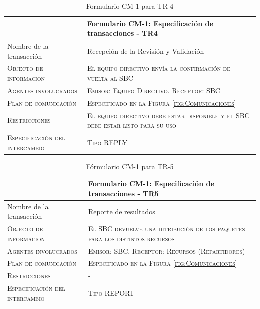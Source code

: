 \begin{table}[H]
  \scriptsize
  \begin{tabularx}{\textwidth}{|l|X|} \hline
    & \textbf{Formulario CM-1: Especificación de transacciones - TR4} \\
    \hline\hline
    {Nombre de la transacción} & Recepción de la Revisión y Validación\\
    \hline  
    \textsc{Objecto de informacion} & \textsc{El equipo directivo envía la confirmación de vuelta al SBC}\\ 
    \hline
    \textsc{Agentes involucrados} & \textsc{Emisor: Equipo Directivo. Receptor: SBC}\\ 
    \hline
    \textsc{Plan de comunicación} & \textsc{Especificado en la Figura \ref{fig:Comunicaciones}}\\ 
    \hline
    \textsc{Restricciones} & \textsc{El equipo directivo debe estar disponible y el SBC debe estar listo para su uso}\\ 
    \hline
    \textsc{Especificación del intercambio} & \textsc{Tipo REPLY}\\ 
    \hline
  \end{tabularx}
    \caption{\label{tab:TR4}Formulario CM-1 para TR-4}
\end{table}

\begin{table}[H]
  \scriptsize
  \begin{tabularx}{\textwidth}{|l|X|} \hline
    & \textbf{Formulario CM-1: Especificación de transacciones - TR5} \\
    \hline\hline
    {Nombre de la transacción} & Reporte de resultados\\
    \hline  
    \textsc{Objecto de informacion} & \textsc{El SBC devuelve una ditribución de los paquetes para los distintos recursos}\\ 
    \hline
    \textsc{Agentes involucrados} & \textsc{Emisor: SBC, Receptor: Recursos (Repartidores)}\\ 
    \hline
    \textsc{Plan de comunicación} & \textsc{Especificado en la Figura \ref{fig:Comunicaciones}}\\ 
    \hline
    \textsc{Restricciones} & \textsc{-}\\ 
    \hline
    \textsc{Especificación del intercambio} & \textsc{Tipo REPORT}\\ 
    \hline
  \end{tabularx}
    \caption{\label{tab:TR5}Fórmulario CM-1 para TR-5}
\end{table}



